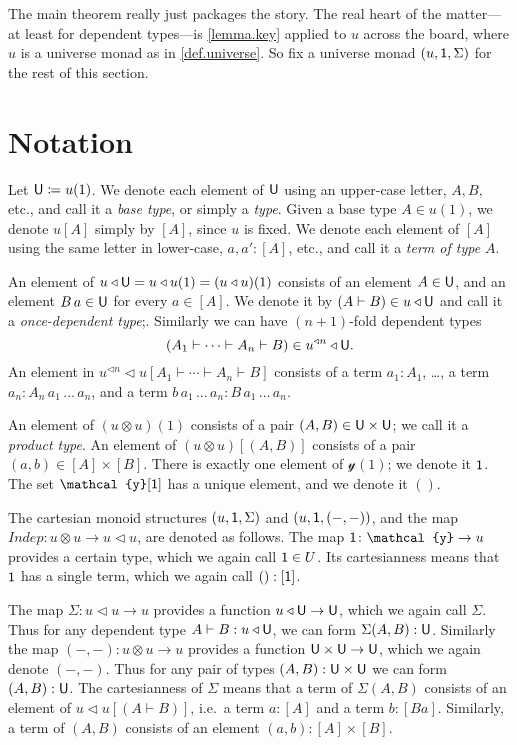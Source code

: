 \documentclass[11pt, one side, article]{memoir}
\theoremstyle{definition}
\theoremstyle{plain}
\newcommand{\Fun}[1]{\mathit{#1}}%
\newcommand{\tn}[1]{\textnormal{#1}}
\newcommand{\yon}{\mathcal{y}}
\newcommand{\0}{\textsf{0}}
\newcommand{\1}{\tn{\textsf{1}}}
\newcommand{\U}{\tn{\textsf{U}}}
\newcommand{\tri}{\mathbin{\triangleleft}}
\newcommand{\tripow}[1]{^{\tri #1}}
\newcommand{\indep}{\Fun{Indep}}
\begin{document}
The main theorem really just packages the story. The real heart of the matter---at least for dependent types---is \cref{lemma.key} applied to $u$ across the board, where $u$ is a universe monad as in \cref{def.universe}. So fix a universe monad $(u,\1,\Sigma)$ for the rest of this section.

\section{Notation}

Let $\U\coloneqq u(1)$. We denote each element of $\U$ using an upper-case letter, $A,B$, etc., and call it a \emph{base type}, or simply a \emph{type}. Given a base type $A\in u(1)$, we denote $u[A]$ simply by $[A]$, since $u$ is fixed. We denote each element of $[A]$ using the same letter in lower-case, $a,a':[A]$, etc., and call it a \emph{term of type $A$}. 

An element of $u\tri\U=u\tri u(1)=(u\tri u)(1)$ consists of an element $A\in\U$, and an element $B\, a\in\U$ for every $a\in [A]$. We denote it by $(A\vdash B)\in u\tri \U$ and call it a \emph{once-dependent type};. Similarly we can have $(n+1)$-fold dependent types
\[(A_1\vdash\cdots\vdash A_n\vdash B)\in u\tripow{n}\tri\U.\]
An element in $u\tripow{n}\tri u[A_1\vdash\cdots\vdash A_n\vdash B]$ consists of a term $a_1:A_1$, \dots, a term $a_n:A_n\, a_1\,\ldots\, a_n$, and a term $b\, a_1\,\ldots\, a_n:B\, a_1\,\ldots\, a_n$.

An element of $(u\otimes u)(1)$ consists of a pair $(A,B)\in\U\times\U$; we call it a \emph{product type}. An element of $(u\otimes u)[(A,B)]$ consists of a pair $(a,b)\in [A]\times[B]$. There is exactly one element of $\yon(1)$; we denote it $\1$. The set $\yon[\1]$ has a unique element, and we denote it $()$.

The cartesian monoid structures $(u,\1,\Sigma)$ and $(u,\1,(-,-))$, and the map $\indep\colon u\otimes u\to u\tri u$, are denoted as follows. The map $\1\colon\yon\to u$ provides a certain type, which we again call $\1\in U$. Its cartesianness means that $\1$ has a single term, which we again call $():[\1]$.

The map $\Sigma\colon u\tri u\to u$ provides a function $u\tri\U\to\U$, which we again call $\Sigma$. Thus for any dependent type $A\vdash B:u\tri\U$, we can form $\Sigma(A,B):\U$. Similarly the map $(-,-)\colon u\otimes u\to u$ provides a function $\U\times \U\to\U$, which we again denote $(-,-)$. Thus for any pair of types $(A,B):\U\times \U$ we can form $(A,B):\U$. The cartesianness of $\Sigma$ means that a term of $\Sigma(A,B)$ consists of an element of $u\tri u[(A\vdash B)]$, i.e.\ a term $a:[A]$ and a term $b:[Ba]$. Similarly, a term of $(A,B)$ consists of an element $(a,b):[A]\times[B]$. 
\end{document}
